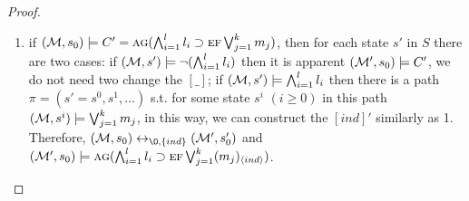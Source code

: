 \documentclass{article}
\begin{document}
\begin{proof}
\begin{enumerate}
    \item if $({\cal M}, s_0) \models C'=\textsc{a} \textsc{g}(\bigwedge_{i=1}^l l_i \supset \textsc{e} \textsc{f} \bigvee_{j=1}^k m_j)$, then for each state $s'$ in $S$ there are two cases: if $({\cal M},s') \models \neg (\bigwedge_{i=1}^l l_i)$ then it is apparent $({\cal M}', s_0) \models C'$, we do not need two change the $[\_]$; if $({\cal M},s') \models \bigwedge_{i=1}^l l_i$ then there is a path $\pi=(s'=s^0, s^1,\dots)$ s.t. for some state $s^i$ $(i\geq 0)$ in this path $({\cal M},s^i) \models \bigvee_{j=1}^k m_j$, in this way, we can construct the $[ind]'$ similarly as 1. Therefore, $(\Hm,s_0) \lrto_{{\O}, \{ind\}} (\Hm',s_0')$ and $({\cal M}',s_0) \models \textsc{a} \textsc{g}(\bigwedge_{i=1}^l l_i \supset \textsc{e} \textsc{f} \bigvee_{j=1}^k (m_j)_{\langle{ind}\rangle})$.
\end{enumerate}
\end{proof}
\end{document}
